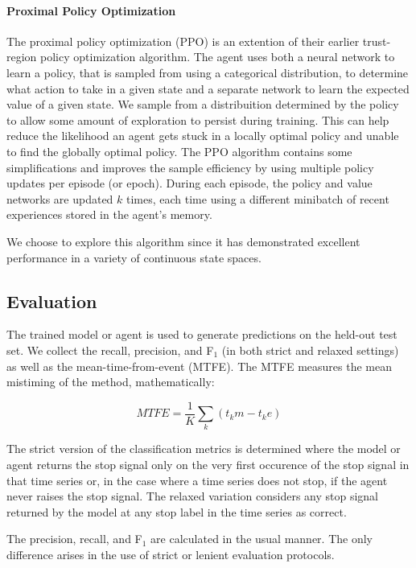 \documentclass[12pt]{article}
\begin{document}
\paragraph{Proximal Policy Optimization}
The proximal policy optimization (PPO)\cite{Schulman2017ProximalPO} is an extention of their earlier trust-region policy
optimization algorithm\cite{Schulman2015TrustRP}. The agent uses both a neural network to learn a policy, that is sampled
from using a categorical distribution, to determine what action to take in a given state and a separate network to learn
the expected value of a given state. We sample from a distribuition determined by the policy to allow some amount of exploration
to persist during training. This can help reduce the likelihood an agent gets stuck in a locally optimal policy and unable to 
find the globally optimal policy. The PPO algorithm contains some simplifications and improves the sample
efficiency by using multiple policy updates per episode (or epoch). During each episode, the policy and value networks are
updated $k$ times, each time using a different minibatch of recent experiences stored in the agent's memory.

We choose to explore this algorithm since it has demonstrated excellent performance in a variety of continuous state spaces.

\subsection{Evaluation}
The trained model or agent is used to generate predictions on the held-out test set. We collect the recall, precision, and 
F$_1$ (in both strict and relaxed settings) as well as the mean-time-from-event (MTFE). The MTFE measures the mean mistiming
of the method, mathematically:

\begin{equation}
    MTFE = \frac{1}{K}\sum_k (t_km-t_ke)
\end{equation}

The strict version of the classification metrics is determined where the model or agent returns the stop signal only on the
very first occurence of the stop signal in that time series or, in the case where a time series does not stop, if the agent
never raises the stop signal. The relaxed variation considers any stop signal returned by the model at any stop label
in the time series as correct.

The precision, recall, and F$_1$ are calculated in the usual manner. The only difference arises in the use of strict or 
lenient evaluation protocols.
\end{document}
